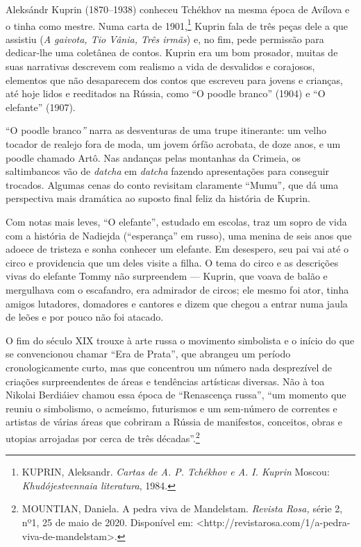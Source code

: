 Aleksándr Kuprin (1870--1938) conheceu Tchékhov na mesma época de
Avílova e o tinha como mestre. Numa carta de 1901,\footnote{KUPRIN,
  Aleksandr. \emph{Cartas de A. P. Tchékhov e A. I. Kuprin} Moscou:
  \emph{Khudójestvennaia literatura}, 1984.} Kuprin fala de três peças
dele a que assistiu (\emph{A gaivota, Tio Vânia, Três irmãs}) e, no fim,
pede permissão para dedicar-lhe uma coletânea de contos. Kuprin era um
bom prosador, muitas de suas narrativas descrevem com realismo a vida de
desvalidos e corajosos, elementos que não desaparecem dos contos que
escreveu para jovens e crianças, até hoje lidos e reeditados na Rússia,
como ``O poodle branco'' (1904) e ``O elefante'' (1907).

``O poodle branco\emph{''} narra as desventuras de uma trupe itinerante:
um velho tocador de realejo fora de moda, um jovem órfão acrobata, de
doze anos, e um poodle chamado Artô. Nas andanças pelas montanhas da
Crimeia, os saltimbancos vão de \emph{datcha} em \emph{datcha} fazendo
apresentações para conseguir trocados. Algumas cenas do conto revisitam
claramente ``Mumu''\emph{,} que dá uma perspectiva mais dramática ao
suposto final feliz da história de Kuprin.

Com notas mais leves, ``O elefante'', estudado em escolas, traz um sopro
de vida com a história de Nadiejda (``esperança'' em russo), uma menina
de seis anos que adoece de tristeza e sonha conhecer um ele­fante. Em
desespero, seu pai vai até o circo e providencia que um deles visite a
filha. O tema do circo e as descrições vivas do elefante Tommy não
surpreendem --- Kuprin, que voava de balão e mergulhava com o
escafandro, era admirador de circos; ele mesmo foi ator, tinha amigos
lutadores, domadores e cantores e dizem que chegou a entrar numa jaula
de leões e por pouco não foi atacado.

O fim do século XIX trouxe à arte russa o movimento simbolista e o
início do que se convencionou chamar ``Era de Prata'', que abrangeu um
período cronologicamente curto, mas que concentrou um número nada
desprezível de criações surpreendentes de áreas e tendências artísticas
diversas. Não à toa Nikolai Berdiáiev chamou essa época de ``Renascença
russa'', ``um momento que reuniu o simbolismo, o acmeísmo, futurismos e
um sem-número de correntes e artistas de várias áreas que cobriram a
Rússia de manifestos, conceitos, obras e utopias arrojadas por cerca de
três décadas''.\footnote{MOUNTIAN, Daniela. A pedra viva de Mandelstam.
  \emph{Revista Rosa,} série 2, nº1, 25 de maio de 2020. Disponível em:
  \textless{}http://revistarosa.com/1/a-pedra-viva-de-mandelstam\textgreater{}.}


